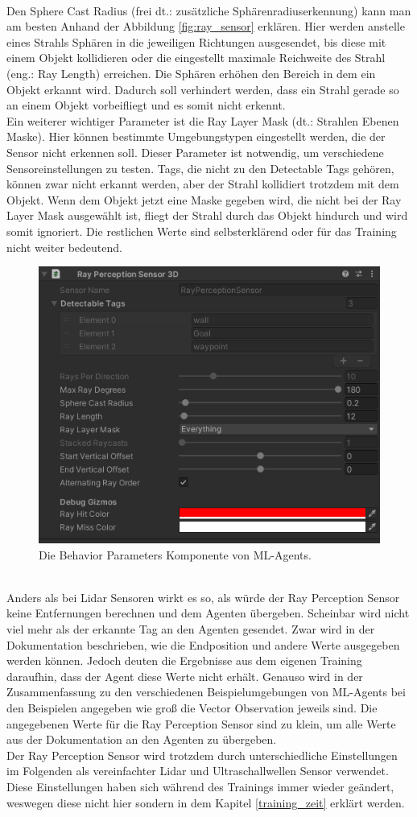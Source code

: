 \\
Den Sphere Cast Radius (frei dt.: zusätzliche Sphärenradiuserkennung) kann man am besten Anhand der Abbildung \ref{fig:ray_sensor} erklären. Hier werden anstelle eines Strahls Sphären in die jeweiligen Richtungen ausgesendet, bis diese mit einem Objekt kollidieren oder die eingestellt maximale Reichweite des Strahl (eng.: Ray Length) erreichen. Die Sphären erhöhen den Bereich in dem ein Objekt erkannt wird. Dadurch soll verhindert werden, dass ein Strahl gerade so an einem Objekt vorbeifliegt und es somit nicht erkennt.
\\
Ein weiterer wichtiger Parameter ist die Ray Layer Mask (dt.: Strahlen Ebenen Maske). Hier können bestimmte Umgebungstypen eingestellt werden, die der Sensor nicht erkennen soll. Dieser Parameter ist notwendig, um verschiedene Sensoreinstellungen zu testen. Tags, die nicht zu den Detectable Tags gehören, können zwar nicht erkannt werden, aber der Strahl kollidiert trotzdem mit dem Objekt. Wenn dem Objekt jetzt eine Maske gegeben wird, die nicht bei der Ray Layer Mask ausgewählt ist, fliegt der Strahl durch das Objekt hindurch und wird somit ignoriert. Die restlichen Werte sind selbsterklärend oder für das Training nicht weiter bedeutend.
\begin{figure} [ht]
	\centering
	\includegraphics[width=0.6\columnwidth]{img/ray_perception_sensor_component}
	\caption[Behavior Parameter Komponente]{Die Behavior Parameters Komponente von ML-Agents.}
	\label{fig:ray_component}
\end{figure}
\\
Anders als bei Lidar Sensoren wirkt es so, als würde der Ray Perception Sensor keine Entfernungen berechnen und dem Agenten übergeben. Scheinbar wird nicht viel mehr als der erkannte Tag an den Agenten gesendet. Zwar wird in der Dokumentation\cite{ray_output} beschrieben, wie die Endposition und andere Werte ausgegeben werden können. Jedoch deuten die Ergebnisse aus dem eigenen Training daraufhin, dass der Agent diese Werte nicht erhält. Genauso wird in der Zusammenfassung zu den verschiedenen Beispielumgebungen von ML-Agents\cite{learning_environments} bei den Beispielen angegeben wie groß die Vector Observation jeweils sind. Die angegebenen Werte für die Ray Perception Sensor sind zu klein, um alle Werte aus der Dokumentation an den Agenten zu übergeben. 
\\
Der Ray Perception Sensor wird trotzdem durch unterschiedliche Einstellungen im Folgenden als vereinfachter Lidar und Ultraschallwellen Sensor verwendet. Diese Einstellungen haben sich während des Trainings immer wieder geändert, weswegen diese nicht hier sondern in dem Kapitel \ref{training_zeit} erklärt werden. 